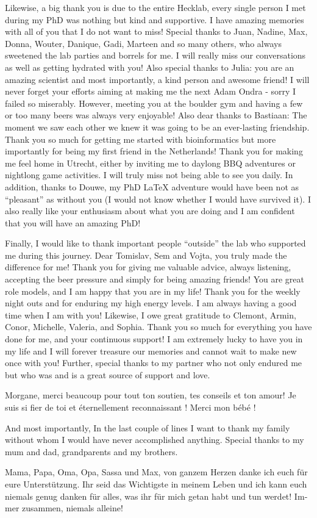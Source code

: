 Likewise, a big thank you is due to the entire Hecklab, every single person I met during my PhD was nothing but kind and supportive. I have amazing memories with all of you that I do not want to miss! Special thanks to Juan, Nadine, Max, Donna, Wouter, Danique, Gadi, Marteen and so many others, who always sweetened the lab parties and borrels for me. I will really miss our conversations as well as getting hydrated with you! Also special thanks to Julia: you are an amazing scientist and most importantly, a kind person and awesome friend! I will never forget your efforts aiming at making me the next Adam Ondra - sorry I failed so miserably. However, meeting you at the boulder gym and having a few or too many beers was always very enjoyable! Also dear thanks to Bastiaan: The moment we saw each other we knew it was going to be an ever-lasting friendship. Thank you so much for getting me started with bioinformatics but more importantly for being my first friend in the Netherlands! Thank you for making me feel home in Utrecht, either by inviting me to daylong BBQ adventures or nightlong game activities. I will truly miss not being able to see you daily. In addition, thanks to Douwe, my PhD LaTeX adventure would have been not as “pleasant” as without you (I would not know whether I would have survived it). I also really like your enthusiasm about what you are doing and I am confident that you will have an amazing PhD!

Finally, I would like to thank important people “outside” the lab who supported me during this journey. Dear Tomislav, Sem and Vojta, you truly made the difference for me! Thank you for giving me valuable advice, always listening, accepting the beer pressure and simply for being amazing friends! You are great role models, and I am happy that you are in my life! Thank you for the weekly night outs and for enduring my high energy levels. I am always having a good time when I am with you! Likewise, I owe great gratitude to Clemont, Armin, Conor, Michelle, Valeria, and Sophia. Thank you so much for everything you have done for me, and your continuous support! I am extremely lucky to have you in my life and I will forever treasure our memories and cannot wait to make new once with you! Further, special thanks to my partner who not only endured me but who was and is a great source of support and love.
\begin{otherlanguage}{french}
    Morgane, merci beaucoup pour tout ton soutien, tes conseils et ton amour! Je suis si fier de toi et éternellement reconnaissant ! Merci mon bébé !
\end{otherlanguage}
And most importantly, In the last couple of lines I want to thank my family without whom I would have never accomplished anything. Special thanks to my mum and dad, grandparents and my brothers.
\begin{otherlanguage}{german}
    Mama, Papa, Oma, Opa, Sassa und Max, von ganzem Herzen danke ich euch für eure Unterstützung. Ihr seid das Wichtigste in meinem Leben und ich kann euch niemals genug danken für alles, was ihr für mich getan habt und tun werdet! Immer zusammen, niemals alleine!
\end{otherlanguage}
\stopthumb

